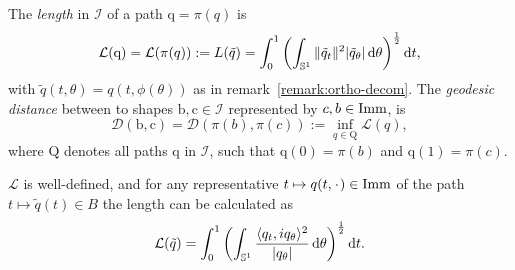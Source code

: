\begin{definition}
  The \textit{length} in $\mathcal{I}$ of a path $\mathrm{q}=\pi(q)$ is
  \begin{equation*}
    \mathcal{L}(\mathrm{q})= \mathcal{L}(\pi(q)) := L(\tilde{q}) =
    \int_{0}^{1}
    \left(
      \int_{\mathbb{S}^{1}} \|\tilde{q}_t\|^2 |\tilde{q}_{\theta}| \mathop{}\!\mathrm{d} \theta
    \right)^{\frac{1}{2}}
    \mathop{}\!\mathrm{d} t,
  \end{equation*}
  with $\tilde{q}(t,\theta)=q(t,\phi(\theta))$ as in remark~\ref{remark:ortho-decom}.
  The \textit{geodesic distance} between to shapes $\mathrm{b}, \mathrm{c} \in \mathcal{I}$ represented by $c,b \in \mathop{}\!\mathrm{Imm}$, is
  \begin{equation*}
    \mathcal{D}(\mathrm{b},\mathrm{c}) = \mathcal{D}(\pi(b),\pi(c)) := \inf_{q \in \mathrm{Q}} \mathcal{L}(q),
  \end{equation*}
  where $\mathrm{Q}$ denotes all paths $\mathrm{q}$ in $\mathcal{I}$, such that $\mathrm{q}(0)=\pi(b)$ and $\mathrm{q}(1)=\pi(c)$.
\end{definition}

\begin{proposition}
  \label{prop:length-quotient}
    $\mathcal{L}$ is well-defined, and for any representative $t \mapsto q(t, \blank) \in \I $ of the path $t \mapsto \tilde{q}(t) \in B$ the length can be calculated as
    \begin{equation}
      \label{eq:length-quotient}
    \mathcal{L}(\tilde{q}) = \int_{0}^{1}
    \left(
      \int_{\mathbb{S}^1}  \frac{\langle q_t, i q_{\theta}\rangle^2}{|q_{\theta}|} \mathop{}\!\mathrm{d} \theta
    \right)^{\frac{1}{2}} \mathop{}\!\mathrm{d} t.
  \end{equation}
\end{proposition}

